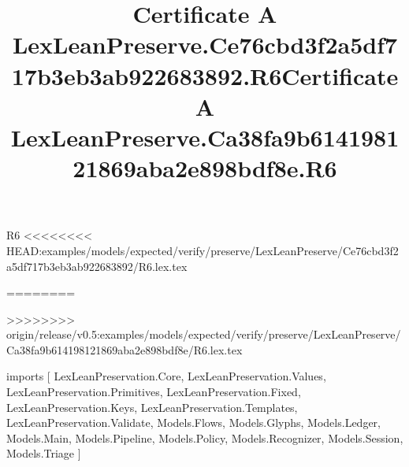 \begin{lexlean}{R6}
<<<<<<<< HEAD:examples/models/expected/verify/preserve/LexLeanPreserve/Ce76cbd3f2a5df717b3eb3ab922683892/R6.lex.tex
\title{Certificate A LexLeanPreserve.Ce76cbd3f2a5df717b3eb3ab922683892.R6}
========
\title{Certificate A LexLeanPreserve.Ca38fa9b614198121869aba2e898bdf8e.R6}
>>>>>>>> origin/release/v0.5:examples/models/expected/verify/preserve/LexLeanPreserve/Ca38fa9b614198121869aba2e898bdf8e/R6.lex.tex
\begin{coremodule}
imports [
  LexLeanPreservation.Core,
  LexLeanPreservation.Values,
  LexLeanPreservation.Primitives,
  LexLeanPreservation.Fixed,
  LexLeanPreservation.Keys,
  LexLeanPreservation.Templates,
  LexLeanPreservation.Validate,
  Models.Flows,
  Models.Glyphs,
  Models.Ledger,
  Models.Main,
  Models.Pipeline,
  Models.Policy,
  Models.Recognizer,
  Models.Session,
  Models.Triage
]


\end{coremodule}
\end{lexlean}
